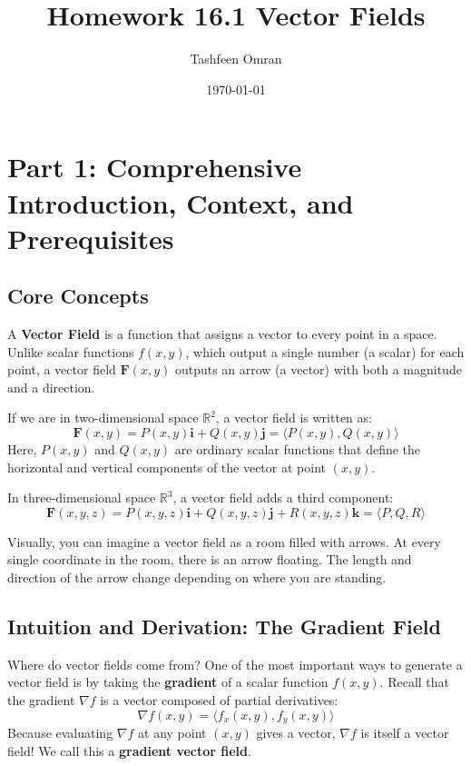 \documentclass[11pt]{article}
\title{Homework 16.1 Vector Fields}
\author{Tashfeen Omran}
\date{\today}
\begin{document}
\maketitle

\tableofcontents
\vspace{0.5cm}
\vspace{0.5cm}

\section{Part 1: Comprehensive Introduction, Context, and Prerequisites}

\subsection{Core Concepts}
A \textbf{Vector Field} is a function that assigns a vector to every point in a space. Unlike scalar functions $f(x, y)$, which output a single number (a scalar) for each point, a vector field $\mathbf{F}(x,y)$ outputs an arrow (a vector) with both a magnitude and a direction. 

If we are in two-dimensional space $\mathbb{R}^2$, a vector field is written as:
\[ \mathbf{F}(x, y) = P(x, y)\mathbf{i} + Q(x, y)\mathbf{j} = \langle P(x, y), Q(x, y) \rangle \]
Here, $P(x,y)$ and $Q(x,y)$ are ordinary scalar functions that define the horizontal and vertical components of the vector at point $(x,y)$. 

In three-dimensional space $\mathbb{R}^3$, a vector field adds a third component:
\[ \mathbf{F}(x, y, z) = P(x, y, z)\mathbf{i} + Q(x, y, z)\mathbf{j} + R(x, y, z)\mathbf{k} = \langle P, Q, R \rangle \]

Visually, you can imagine a vector field as a room filled with arrows. At every single coordinate in the room, there is an arrow floating. The length and direction of the arrow change depending on where you are standing. 

\subsection{Intuition and Derivation: The Gradient Field}
Where do vector fields come from? One of the most important ways to generate a vector field is by taking the \textbf{gradient} of a scalar function $f(x,y)$. 
Recall that the gradient $\nabla f$ is a vector composed of partial derivatives:
\[ \nabla f(x, y) = \langle f_x(x, y), f_y(x, y) \rangle \]
Because evaluating $\nabla f$ at any point $(x,y)$ gives a vector, $\nabla f$ is itself a vector field! We call this a \textbf{gradient vector field}. 
\end{document}

